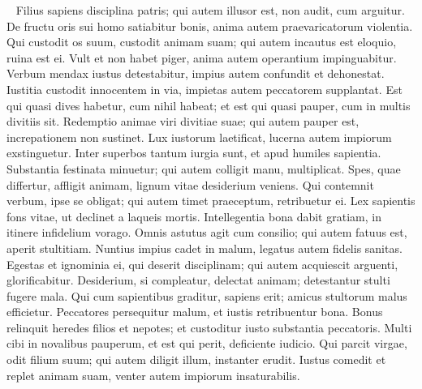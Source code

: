 \begin{biblechapter}   
\verse Filius sapiens disciplina patris; qui autem illusor est, non audit, cum arguitur. 
\verse De fructu oris sui homo satiabitur bonis, anima autem praevaricatorum violentia. 
\verse Qui custodit os suum, custodit animam suam; qui autem incautus est eloquio, ruina est ei. 
\verse Vult et non habet piger, anima autem operantium impinguabitur. 
\verse Verbum mendax iustus detestabitur, impius autem confundit et dehonestat. 
\verse Iustitia custodit innocentem in via, impietas autem peccatorem supplantat. 
\verse Est qui quasi dives habetur, cum nihil habeat; et est qui quasi pauper, cum in multis divitiis sit. 
\verse Redemptio animae viri divitiae suae; qui autem pauper est, increpationem non sustinet. 
\verse Lux iustorum laetificat, lucerna autem impiorum exstinguetur. 
\verse Inter superbos tantum iurgia sunt, et apud humiles sapientia. 
\verse Substantia festinata minuetur; qui autem colligit manu, multiplicat. 
\verse Spes, quae differtur, affligit animam, lignum vitae desiderium veniens. 
\verse Qui contemnit verbum, ipse se obligat; qui autem timet praeceptum, retribuetur ei. 
\verse Lex sapientis fons vitae, ut declinet a laqueis mortis. 
\verse Intellegentia bona dabit gratiam, in itinere infidelium vorago. 
\verse Omnis astutus agit cum consilio; qui autem fatuus est, aperit stultitiam. 
\verse Nuntius impius cadet in malum, legatus autem fidelis sanitas. 
\verse Egestas et ignominia ei, qui deserit disciplinam; qui autem acquiescit arguenti, glorificabitur. 
\verse Desiderium, si compleatur, delectat animam; detestantur stulti fugere mala. 
\verse Qui cum sapientibus graditur, sapiens erit; amicus stultorum malus efficietur. 
\verse Peccatores persequitur malum, et iustis retribuentur bona. 
\verse Bonus relinquit heredes filios et nepotes; et custoditur iusto substantia peccatoris. 
\verse Multi cibi in novalibus pauperum, et est qui perit, deficiente iudicio. 
\verse Qui parcit virgae, odit filium suum; qui autem diligit illum, instanter erudit. 
\verse Iustus comedit et replet animam suam, venter autem impiorum insaturabilis. 
\end{biblechapter}

